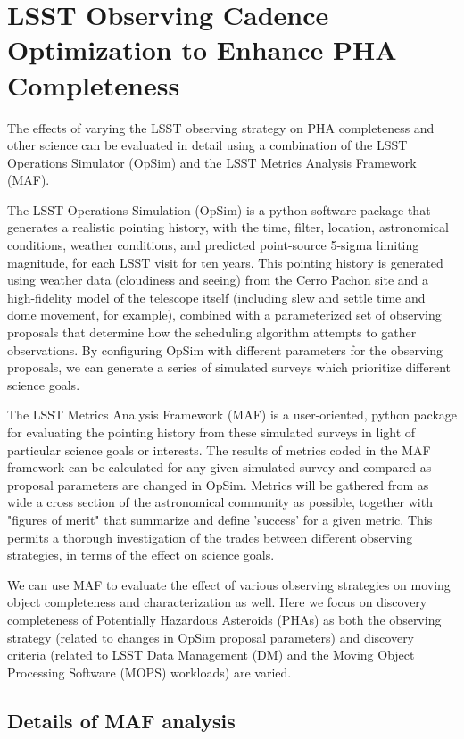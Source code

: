 \section{LSST Observing Cadence Optimization to Enhance PHA Completeness}

The effects of varying the LSST observing strategy on PHA completeness and other science can be evaluated in detail using a combination of the LSST Operations Simulator (OpSim) and the LSST Metrics Analysis Framework (MAF). 

The LSST Operations Simulation (OpSim) is a python software package that generates a realistic pointing history, with the time, filter, location, astronomical conditions, weather conditions, and predicted point-source 5-sigma limiting magnitude, for each LSST visit for ten years. This pointing history is generated using weather data (cloudiness and seeing) from the Cerro Pachon site and a high-fidelity model of the telescope itself (including slew and settle time and dome movement, for example), combined with a parameterized set of observing proposals that determine how the scheduling algorithm attempts to gather observations. By configuring OpSim with different parameters for the observing proposals, we can generate a series of simulated surveys which prioritize different science goals. 

The LSST Metrics Analysis Framework (MAF) is a user-oriented, python package for evaluating the pointing history from these simulated surveys in light of particular science goals or interests. The results of metrics coded in the MAF framework can be calculated for any given simulated survey and compared as proposal parameters are changed in OpSim. Metrics will be gathered from as wide a cross section of the astronomical community as possible, together with "figures of merit" that summarize and define 'success' for a given metric. This permits a thorough investigation of the trades between different observing strategies, in terms of the effect on science goals.

We can use MAF to evaluate the effect of various observing strategies on moving object completeness and characterization as well. Here we focus on discovery completeness of Potentially Hazardous Asteroids (PHAs) as both the observing strategy (related to changes in OpSim proposal parameters) and discovery criteria (related to LSST Data Management (DM) and the Moving Object Processing Software (MOPS) workloads) are varied. 

\subsection{Details of MAF analysis}

